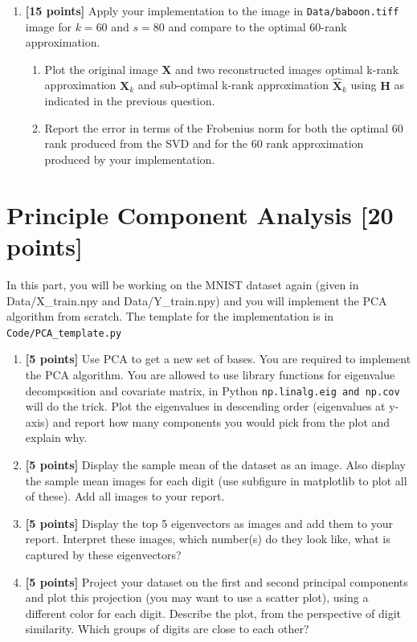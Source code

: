 \documentclass[letterpaper]{article}
\newcommand {\bX}{\mathbf{X}}
\newcommand {\bH}{\mathbf{H}}
\begin{document}
\begin{enumerate}
\item \textbf{[15 points]}
Apply your implementation to the image in \texttt{Data/baboon.tiff} image for $k = 60$ and $s = 80$ and compare to the optimal $60$-rank approximation.


\begin{enumerate}
\item  Plot the original image $\bX$ and two reconstructed images optimal k-rank approximation $\bX_k$ and sub-optimal k-rank approximation $\hat{\bX}_k$ using $\bH$ as indicated in the previous question.

\item Report the error in terms of the Frobenius norm for both the optimal 60 rank produced from the SVD and for the 60 rank approximation produced by your implementation. 
\end{enumerate}


\end{enumerate}

\section{Principle Component Analysis [20 points]}
In this part, you will be working on the MNIST dataset again (given in Data/X\_train.npy and Data/Y\_train.npy) and you will implement the PCA algorithm from scratch. The template for the implementation is in \texttt{Code/PCA\_template.py}

\begin{enumerate}

	\item {\textbf{[5 points]}} Use PCA to get a new set of bases. You are required to implement the PCA algorithm. You are allowed to use library functions for eigenvalue decomposition and covariate matrix, in Python \texttt{np.linalg.eig and np.cov} will do the trick. Plot the eigenvalues in descending order (eigenvalues at y-axis) and report how many components you would pick from the plot and explain why.
	
	\item {\textbf{[5 points]}} Display the sample mean of the dataset as an image. Also display the sample mean images for each digit (use subfigure in matplotlib to plot all of these). Add all images to your report.
	\item {\textbf{[5 points]}} Display the top 5 eigenvectors as images and add them to your report. Interpret these images, which number(s) do they look like, what is captured by these eigenvectors?

	\item {\textbf{[5 points]}} Project your dataset on the first and second principal components and plot this projection (you may want to use a scatter plot), using a different color for each digit. Describe the plot, from the perspective of digit similarity. Which groups of digits are close to each other?
	
\end{enumerate}
\end{document}
